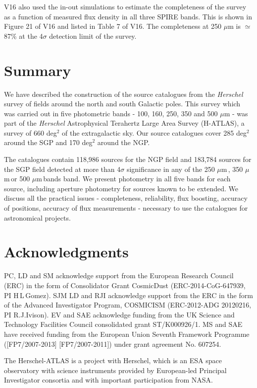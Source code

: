 \documentclass[useAMS,usenatbib]{mnras}
\def\mic{ $\mu $m\,}
\begin{document}
V16 also used the in-out simulations to estimate the completeness of
the survey as a function of measured flux density in all three SPIRE
bands. This is shown in Figure 21 of V16 and listed in Table 7 of
V16. The completeness at 250 $\mu$m is $\simeq$87\% at the 4$\sigma$
detection limit of the survey.



\section{Summary}

We have described the construction of the source catalogues from the
{\it Herschel} survey of fields around the north and south Galactic
poles. This survey which was carried out in five photometric bands -
100, 160, 250, 350 and 500 $\mu$m - was part of the {\it Herschel}
Astrophysical Terahertz Large Area Survey (H-ATLAS), a survey of 660
deg$^2$ of the extragalactic sky. Our source catalogues cover 285
deg$^2$ around the SGP and 170 deg$^2$ around the NGP.

The catalogues contain 118,986 sources for the NGP field and 183,784
sources for the SGP field detected at more than 4$\sigma$ significance
in any of the 250\mic, 350\mic or 500\mic bands band. We present
photometry in all five bands for each source, including aperture
photometry for sources known to be extended. We discuss all the
practical issues - completeness, reliability, flux boosting, accuracy
of positions, accuracy of flux measurements - necessary to use the
catalogues for astronomical projects.

\section*{Acknowledgments}

PC, LD and SM acknowledge support from the European Research Council
(ERC) in the form of Consolidator Grant {\sc CosmicDust}
(ERC-2014-CoG-647939, PI H\,L\,Gomez).  SJM LD and RJI acknowledge
support from the ERC in the form of the Advanced Investigator
Program, COSMICISM (ERC-2012-ADG 20120216, PI R.J.Ivison).  EV and SAE
acknowledge funding from the UK Science and Technology Facilities
Council consolidated grant ST/K000926/1.  MS and SAE have received
funding from the European Union Seventh Framework Programme
([FP7/2007-2013] [FP7/2007-2011]) under grant agreement No. 607254.

The Herschel-ATLAS is a project with Herschel, which is an ESA space
observatory with science instruments provided by European-led
Principal Investigator consortia and with important participation from
NASA.
\end{document}
